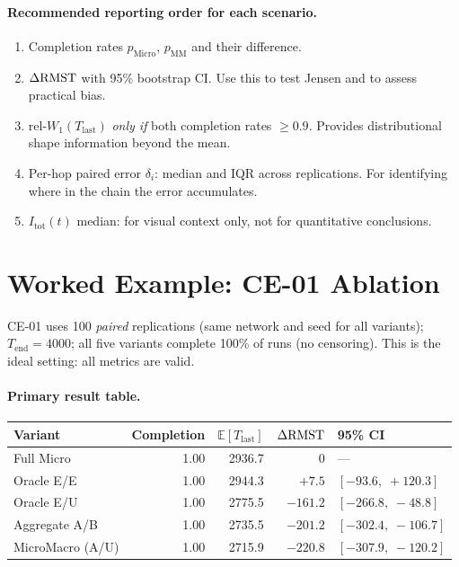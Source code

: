 \documentclass[11pt,a4paper]{article}
\begin{document}
\paragraph{Recommended reporting order for each scenario.}
\begin{enumerate}
  \item Completion rates $p_{\mathrm{Micro}}$, $p_{\mathrm{MM}}$ and their
        difference.
  \item $\Delta\mathrm{RMST}$ with 95\% bootstrap CI.  Use this to test Jensen and to
        assess practical bias.
  \item rel-$W_1(T_{\mathrm{last}})$ \emph{only if} both completion rates
        $\geq 0.9$.  Provides distributional shape information beyond the mean.
  \item Per-hop paired error $\delta_i$: median and IQR across replications.
        For identifying where in the chain the error accumulates.
  \item $I_{\mathrm{tot}}(t)$ median: for visual context only, not for
        quantitative conclusions.
\end{enumerate}

\section{Worked Example: CE-01 Ablation}

CE-01 uses 100 \emph{paired} replications (same network and seed for all
variants); $T_{\mathrm{end}} = 4000$; all five variants complete 100\%
of runs (no censoring).  This is the ideal setting: all metrics are valid.

\paragraph{Primary result table.}
\begin{center}
\begin{tabular}{lrrrl}
\toprule
Variant & Completion & $\mathbb{E}[T_{\mathrm{last}}]$ & $\Delta\mathrm{RMST}$ & 95\% CI \\
\midrule
Full Micro         & 1.00 & 2936.7 & $0$       & --- \\
Oracle E/E         & 1.00 & 2944.3 & $+7.5$    & $[-93.6,\;+120.3]$ \\
Oracle E/U         & 1.00 & 2775.5 & $-161.2$  & $[-266.8,\;-48.8]$ \\
Aggregate A/B      & 1.00 & 2735.5 & $-201.2$  & $[-302.4,\;-106.7]$ \\
MicroMacro (A/U)   & 1.00 & 2715.9 & $-220.8$  & $[-307.9,\;-120.2]$ \\
\bottomrule
\end{tabular}
\end{center}
\end{document}
